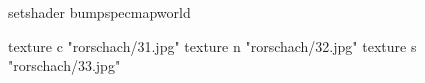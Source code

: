 setshader bumpspecmapworld

    texture c "rorschach/31.jpg"
    texture n "rorschach/32.jpg"
    texture s "rorschach/33.jpg"
